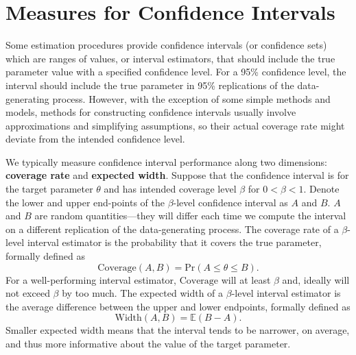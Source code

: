 \documentclass[
]{book}
\newcommand{\Prob}{\text{Pr}}
\newcommand{\E}{\mathbb{E}}
\begin{document}
\section{Measures for Confidence Intervals}\label{measures-for-confidence-intervals}

Some estimation procedures provide confidence intervals (or confidence sets) which are ranges of values, or interval estimators, that should include the true parameter value with a specified confidence level.
For a 95\% confidence level, the interval should include the true parameter in 95\% replications of the data-generating process.
However, with the exception of some simple methods and models, methods for constructing confidence intervals usually involve approximations and simplifying assumptions, so their actual coverage rate might deviate from the intended confidence level.

We typically measure confidence interval performance along two dimensions: \textbf{coverage rate} and \textbf{expected width}.
Suppose that the confidence interval is for the target parameter \(\theta\) and has intended coverage level \(\beta\) for \(0 < \beta < 1\).
Denote the lower and upper end-points of the \(\beta\)-level confidence interval as \(A\) and \(B\).
\(A\) and \(B\) are random quantities---they will differ each time we compute the interval on a different replication of the data-generating process.
The coverage rate of a \(\beta\)-level interval estimator is the probability that it covers the true parameter, formally defined as
\[
\text{Coverage}(A,B) = \Prob(A \leq \theta \leq B).
\label{eq:coverage}
\]
For a well-performing interval estimator, \(\text{Coverage}\) will at least \(\beta\) and, ideally will not exceed \(\beta\) by too much.
The expected width of a \(\beta\)-level interval estimator is the average difference between the upper and lower endpoints, formally defined as
\[
\text{Width}(A,B) = \E(B - A).
\label{eq:expected-width}
\]
Smaller expected width means that the interval tends to be narrower, on average, and thus more informative about the value of the target parameter.
\end{document}
